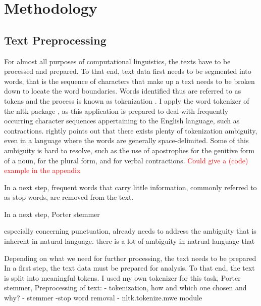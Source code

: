 \documentclass[11pt,a4paper,english,oneside]{book}
\numberwithin{equation}{chapter}
\begin{document}
\section{Methodology}


\subsection{Text Preprocessing}\label{preprocessing}
For almost all purposes of computational linguistics, the texts have to be processed and prepared. To that end, text data first needs to be segmented into words, that is the sequence of characters that make up a text needs to be broken down to locate the word boundaries. Words identified thus are referred to as tokens and the process is known as tokenization \cite[p. 10]{Palmer.2010}. I apply the word tokenizer of the nltk package \citep{Bird.2010}, as this application is prepared to deal with frequently occurring character sequences appertaining to the English language, such as contractions. \citet[pp. 16-19]{Palmer.2010} rightly points out that there exists plenty of tokenization ambiguity, even in a language where the words are generally space-delimited. Some of this ambiguity is hard to resolve, such as the use of apostrophes for the genitive form of a noun, for the plural form, and for verbal contractions. \textcolor{red}{Could give a (code) example in the appendix}

In a next step, frequent words that carry little information, commonly referred to as stop words, are removed from the text. 

In a next step, Porter stemmer 

 especially concerning punctuation,  already needs to address the ambiguity that is inherent in natural language. there is a lot of ambiguity in natrual language that 

Depending on what we need for further processing, the text needs to be prepared 
In a first step, the text data must be prepared for analysis. To that end, the text is split into meaningful tokens. I used my own tokenizer for this task,
Porter stemmer,  
Preprocessing of text:
 - tokenization, how and which one chosen and why?
 - stemmer 
 	-stop word removal
 	- nltk.tokenize.mwe module
 	
\end{document}
